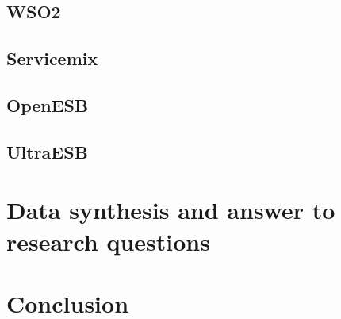 \documentclass{llncs}
\begin{document}
	\subsection{WSO2}
	\subsection{Servicemix}
	\subsection{OpenESB}
	\subsection{UltraESB}

\section{Data synthesis and answer to research questions}
\section{Conclusion}



\end{document}
